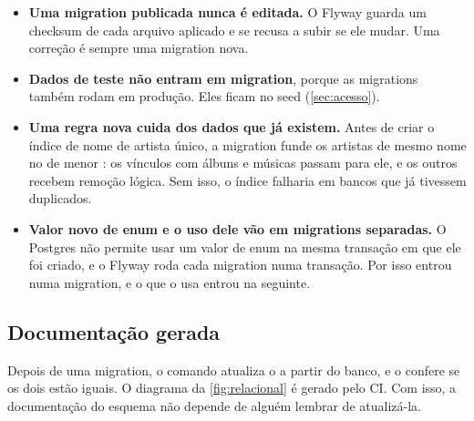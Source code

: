 \begin{itemize}
  \item \textbf{Uma migration publicada nunca é editada.} O Flyway guarda um
    checksum de cada arquivo aplicado e se recusa a subir se ele mudar. Uma
    correção é sempre uma migration nova.
  \item \textbf{Dados de teste não entram em migration}, porque as migrations
    também rodam em produção. Eles ficam no seed (\cref{sec:acesso}).
  \item \textbf{Uma regra nova cuida dos dados que já existem.} Antes de criar
    o índice de nome de artista único, a migration
     funde os artistas de mesmo nome no de menor
    : os vínculos com álbuns e músicas passam para ele, e os outros
    recebem remoção lógica. Sem isso, o índice falharia em bancos que já
    tivessem duplicados.
  \item \textbf{Valor novo de enum e o uso dele vão em migrations separadas.}
    O Postgres não permite usar um valor de enum na mesma transação em que ele
    foi criado, e o Flyway roda cada migration numa transação. Por isso
     entrou numa migration, e o  que o usa
    entrou na seguinte.
\end{itemize}

\subsection{Documentação gerada}

Depois de uma migration, o comando  atualiza o
 a partir do banco, e o  confere se
os dois estão iguais. O diagrama da \cref{fig:relacional} é gerado pelo CI.
Com isso, a documentação do esquema não depende de alguém lembrar de
atualizá-la.
